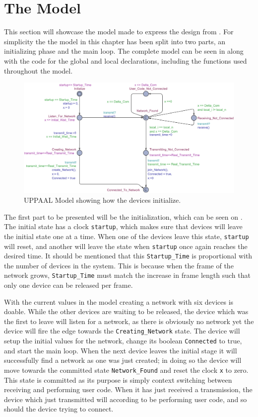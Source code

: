 \section{The Model}
This section will showcase the model made to express the design from .
For simplicity the the model in this chapter has been split into two parts, an initializing phase and the main loop.
The complete model can be seen in  along with the code for the global and local declarations, including the functions used throughout the model.

\begin{figure}
  \includegraphics[width=1\textwidth]{Figures/Model/Device_Connecting.pdf} 
\caption{UPPAAL Model showing how the devices initialize.}
\label{fig:UPPAAL_Intitialization}
\end{figure}

\bigskip \noindent
The first part to be presented will be the initialization, which can be seen on .
The initial state has a clock \texttt{startup}, which makes sure that devices will leave the initial state one at a time.
When one of the devices leave this state, \texttt{startup} will reset, and another will leave the state when \texttt{startup} once again reaches the desired time.
It should be mentioned that this \texttt{Startup\_Time} is proportional with the number of devices in the system.
This is because when the frame of the network grows, \texttt{Startup\_Time} must match the increase in frame length such that only one device can be released per frame.

With the current values in the model creating a network with six devices is doable.
While the other devices are waiting to be released, the device which was the first to leave will listen for a network, as there is obviously no network yet the device will fire the edge towards the \texttt{Creating\_Network} state.
The device will setup the initial values for the network, change its boolean \texttt{Connected} to true, and start the main loop.
When the next device leaves the initial stage it will successfully find a network as one was just created; in doing so the device will move towards the committed state \texttt{Network\_Found} and reset the clock \texttt{x} to zero.
This state is committed as its purpose is simply context switching between receiving and performing user code.
When it has just received a transmission, the device which just transmitted will according to  be performing user code, and so should the device trying to connect.

